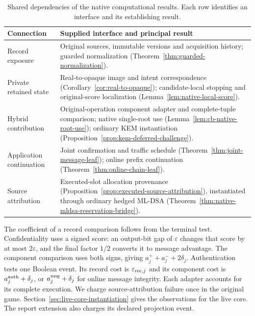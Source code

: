 \documentclass[pdflatex]{sn-jnl}
\theoremstyle{thmstyleone}
\theoremstyle{thmstylethree}
\theoremstyle{thmstyletwo}
\begin{document}
\begin{table}[t]
\caption{Shared dependencies of the native computational results.
Each row identifies an interface and its establishing result.}
\label{tab:computational-dependencies}
\small
\begin{tabularx}{\textwidth}{@{}L{0.25\textwidth}Y@{}}
\toprule
Connection & Supplied interface and principal result \\
\midrule
Record exposure & Original sources, immutable versions and acquisition
history; guarded normalization
(Theorem~\ref{thm:guarded-normalization}). \\
Private retained state & Real-to-opaque image and intent correspondence
(Corollary~\ref{cor:real-to-opaque}); candidate-local stopping and
original-score localization (Lemma~\ref{lem:native-local-score}). \\
Hybrid contribution & Original-operation component adapter and
complete-tuple comparison; native single-root use
(Lemma~\ref{lem:cb-native-root-use}); ordinary KEM instantiation
(Proposition~\ref{prop:kem-deferred-challenge}). \\
Application continuation & Joint confirmation and traffic schedule
(Theorem~\ref{thm:joint-message-leaf}); online prefix continuation
(Theorem~\ref{thm:online-chain-leaf}). \\
Source attribution & Executed-slot allocation provenance
(Proposition~\ref{prop:executed-source-attribution}), instantiated through
ordinary hedged ML-DSA
(Theorem~\ref{thm:native-mldsa-reservation-bridge}). \\
\bottomrule
\end{tabularx}
\end{table}

The coefficient of a record comparison follows from the terminal test.
Confidentiality uses a signed score: an output-bit gap of
$\varepsilon$ changes that score by at most $2\varepsilon$, and the
final factor $1/2$ converts it to message advantage. The component
comparison uses both signs, giving $a_j^++a_j^-+2\delta_j$.
Authentication tests one Boolean event. Its record cost is
$\varepsilon_{{\rm rec},j}$ and its component cost is
$a_j^{\rm auth}+\delta_j$, or $a_j^{\rm msg}+\delta_j$ for online
message integrity. Each adapter accounts for its complete execution.
We charge source-attribution failure once in the original game.
Section~\ref{sec:live-core-instantiation} gives the observations for
the live core. The report extension also charges its declared
projection event.
\end{document}
